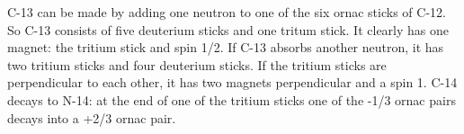 C-13 can be made by adding one neutron to one of the six ornac sticks of C-12. So C-13 consists of five deuterium sticks and one tritum stick. It clearly has one magnet: the tritium stick and spin 1/2. If C-13 absorbs another neutron, it has two tritium sticks and four deuterium sticks. If the tritium sticks are perpendicular to each other, it has two magnets perpendicular and a spin 1. C-14 decays to N-14: at the end of one of the tritium sticks one of the -1/3 ornac pairs decays into a +2/3 ornac pair.













